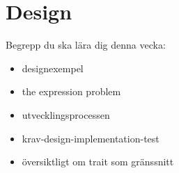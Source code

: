 \chapter{Design}\label{chapter:W13}
Begrepp du ska lära dig denna vecka:
\begin{itemize}[noitemsep,label={$\square$},leftmargin=*]
\item designexempel
\item the expression problem
\item utvecklingsprocessen
\item krav-design-implementation-test
\item översiktligt om trait som gränssnitt\end{itemize}

